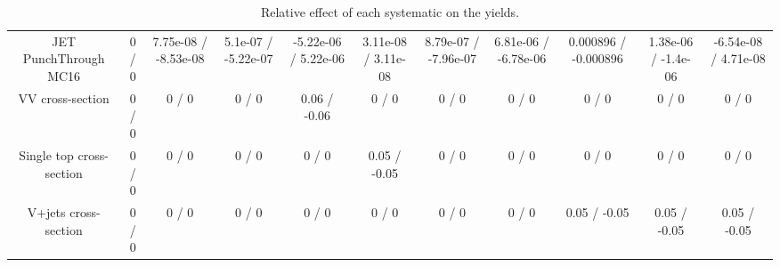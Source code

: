 \begin{table}[htbp]
\begin{center}
\begin{tabular}{|c|c|c|c|c|c|c|c|c|c|c|}
  JET PunchThrough MC16 & 0 / 0 & 7.75e-08 / -8.53e-08 & 5.1e-07 / -5.22e-07 & -5.22e-06 / 5.22e-06 & 3.11e-08 / 3.11e-08 & 8.79e-07 / -7.96e-07 & 6.81e-06 / -6.78e-06 & 0.000896 / -0.000896 & 1.38e-06 / -1.4e-06 & -6.54e-08 / 4.71e-08 \\ 
  VV cross-section & 0 / 0 & 0 / 0 & 0 / 0 & 0.06 / -0.06 & 0 / 0 & 0 / 0 & 0 / 0 & 0 / 0 & 0 / 0 & 0 / 0 \\ 
  Single top cross-section & 0 / 0 & 0 / 0 & 0 / 0 & 0 / 0 & 0.05 / -0.05 & 0 / 0 & 0 / 0 & 0 / 0 & 0 / 0 & 0 / 0 \\ 
  V+jets cross-section & 0 / 0 & 0 / 0 & 0 / 0 & 0 / 0 & 0 / 0 & 0 / 0 & 0 / 0 & 0.05 / -0.05 & 0.05 / -0.05 & 0.05 / -0.05 \\ 
\hline 
\end{tabular} 
\caption{Relative effect of each systematic on the yields.} 
\end{center} 
\end{table} 
